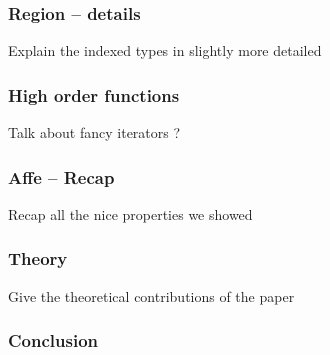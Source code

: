 \documentclass[aspectratio=169,dvipsnames,svgnames,10pt]{beamer}
\begin{document}
\begin{frame}
  \frametitle{Region -- details}
  Explain the indexed types in slightly more detailed
\end{frame}

\begin{frame}
  \frametitle{High order functions}

  Talk about fancy iterators ?
  
\end{frame}

\begin{frame}
  \frametitle{Affe -- Recap}
  Recap all the nice properties we showed
\end{frame}

\begin{frame}
  \frametitle{Theory}
  Give the theoretical contributions of the paper
\end{frame}

\begin{frame}
  \frametitle{Conclusion}
  
\end{frame}


\end{document}
